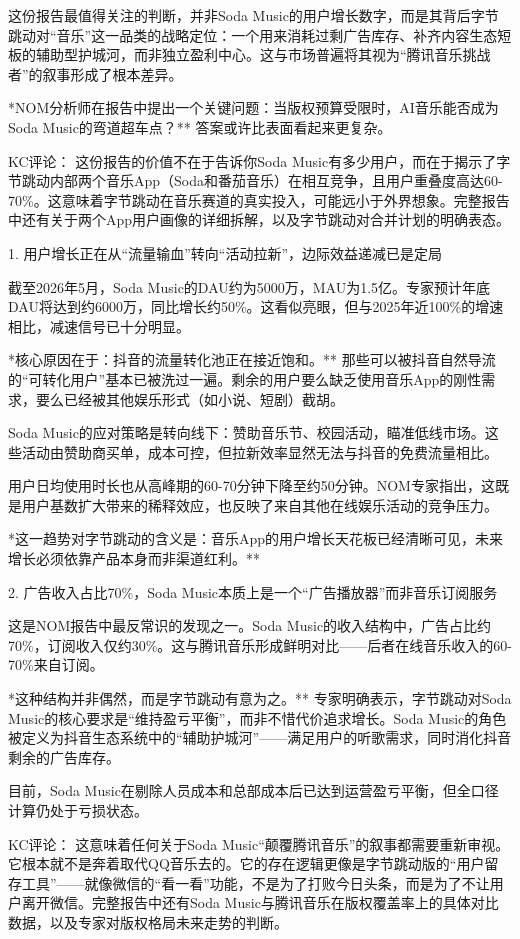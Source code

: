 \documentclass[11pt]{ctexart}
\begin{document}
这份报告最值得关注的判断，并非Soda Music的用户增长数字，而是其背后字节跳动对“音乐”这一品类的战略定位：一个用来消耗过剩广告库存、补齐内容生态短板的辅助型护城河，而非独立盈利中心。这与市场普遍将其视为“腾讯音乐挑战者”的叙事形成了根本差异。

*NOM分析师在报告中提出一个关键问题：当版权预算受限时，AI音乐能否成为Soda Music的弯道超车点？** 答案或许比表面看起来更复杂。

KC评论： 这份报告的价值不在于告诉你Soda Music有多少用户，而在于揭示了字节跳动内部两个音乐App（Soda和番茄音乐）在相互竞争，且用户重叠度高达60-70\%。这意味着字节跳动在音乐赛道的真实投入，可能远小于外界想象。完整报告中还有关于两个App用户画像的详细拆解，以及字节跳动对合并计划的明确表态。

1. 用户增长正在从“流量输血”转向“活动拉新”，边际效益递减已是定局

截至2026年5月，Soda Music的DAU约为5000万，MAU为1.5亿。专家预计年底DAU将达到约6000万，同比增长约50\%。这看似亮眼，但与2025年近100\%的增速相比，减速信号已十分明显。

*核心原因在于：抖音的流量转化池正在接近饱和。** 那些可以被抖音自然导流的“可转化用户”基本已被洗过一遍。剩余的用户要么缺乏使用音乐App的刚性需求，要么已经被其他娱乐形式（如小说、短剧）截胡。

Soda Music的应对策略是转向线下：赞助音乐节、校园活动，瞄准低线市场。这些活动由赞助商买单，成本可控，但拉新效率显然无法与抖音的免费流量相比。

用户日均使用时长也从高峰期的60-70分钟下降至约50分钟。NOM专家指出，这既是用户基数扩大带来的稀释效应，也反映了来自其他在线娱乐活动的竞争压力。

*这一趋势对字节跳动的含义是：音乐App的用户增长天花板已经清晰可见，未来增长必须依靠产品本身而非渠道红利。**

2. 广告收入占比70\%，Soda Music本质上是一个“广告播放器”而非音乐订阅服务

这是NOM报告中最反常识的发现之一。Soda Music的收入结构中，广告占比约70\%，订阅收入仅约30\%。这与腾讯音乐形成鲜明对比——后者在线音乐收入的60-70\%来自订阅。

*这种结构并非偶然，而是字节跳动有意为之。** 专家明确表示，字节跳动对Soda Music的核心要求是“维持盈亏平衡”，而非不惜代价追求增长。Soda Music的角色被定义为抖音生态系统中的“辅助护城河”——满足用户的听歌需求，同时消化抖音剩余的广告库存。

目前，Soda Music在剔除人员成本和总部成本后已达到运营盈亏平衡，但全口径计算仍处于亏损状态。

KC评论： 这意味着任何关于Soda Music“颠覆腾讯音乐”的叙事都需要重新审视。它根本就不是奔着取代QQ音乐去的。它的存在逻辑更像是字节跳动版的“用户留存工具”——就像微信的“看一看”功能，不是为了打败今日头条，而是为了不让用户离开微信。完整报告中还有Soda Music与腾讯音乐在版权覆盖率上的具体对比数据，以及专家对版权格局未来走势的判断。
\end{document}
